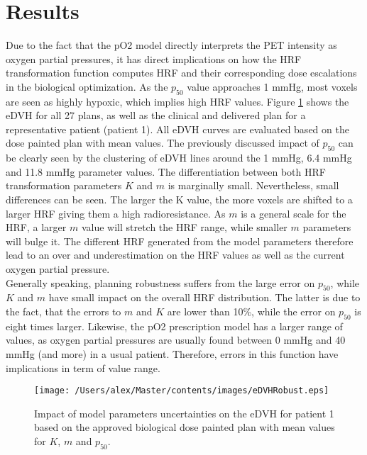 \section{Results}
Due to the fact that the pO2 model directly interprets the PET intensity as oxygen partial pressures, it has direct implications on how the HRF transformation function computes HRF and their corresponding dose escalations in the biological optimization. As the $p_{50}$ value approaches 1 mmHg, most voxels are seen as highly hypoxic, which implies high HRF values. Figure \ref{fig:eDVHRobust} shows the eDVH for all 27 plans, as well as the clinical and delivered plan for a representative patient  (patient 1). All eDVH curves are evaluated based on the dose painted plan with mean values. The previously discussed impact of $p_{50}$ can be clearly seen by the clustering of eDVH lines around the 1 mmHg, 6.4 mmHg and 11.8 mmHg parameter values. The differentiation between both HRF transformation parameters $K$ and $m$ is marginally small. Nevertheless, small differences can be seen. The larger the K value, the more voxels are shifted to a larger HRF giving them a high radioresistance. As $m$ is a general scale for the HRF, a larger $m$ value will stretch the HRF range, while smaller $m$ parameters will bulge it. The different HRF generated from the model parameters therefore lead to an over and underestimation on the HRF values as well as the current oxygen partial pressure.\\Generally speaking, planning robustness suffers from the large error on $p_{50}$, while $K$ and $m$ have small impact on the overall HRF distribution. The latter is due to the fact, that the errors to $m$ and $K$ are lower than 10\%, while the error on $p_{50}$ is eight times larger. Likewise, the pO2 prescription model has a larger range of values, as oxygen partial pressures are usually found between 0 mmHg and 40 mmHg (and more) in a usual patient. Therefore, errors in this function have implications in term of value range.
\begin{figure}[htb]
\centering
\texttt{[image: /Users/alex/Master/contents/images/eDVHRobust.eps]}
\vspace{1cm}
\caption{Impact of model parameters uncertainties on the eDVH for patient 1 based on the approved biological dose painted plan with mean values for $K$, $m$ and $p_{50}$.}
\label{fig:eDVHRobust}
\end{figure}

